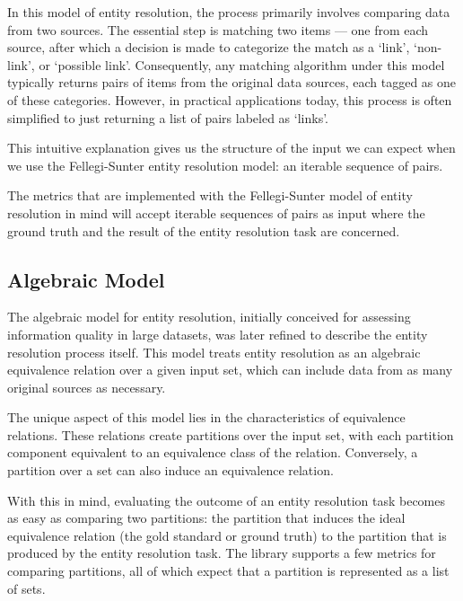 \documentclass[a4paper,twoside]{article}
\begin{document}
    In this model of entity resolution, the process primarily involves comparing
    data from two sources.
    The essential step is matching two items --- one from each source, after
    which a decision is made to categorize the match as a `link', `non-link', or
    `possible link'.
    Consequently, any matching algorithm under this model typically returns
    pairs of items from the original data sources, each tagged as one of these
    categories.
    However, in practical applications today, this process is often simplified
    to just returning a list of pairs labeled as `links'.

    This intuitive explanation gives us the structure of the input we can expect
    when we use the Fellegi-Sunter entity resolution model: an iterable sequence
    of pairs.

    The metrics that are implemented with the Fellegi-Sunter model of entity
    resolution in mind will accept iterable sequences of pairs as input where
    the ground truth and the result of the entity resolution task are concerned.

    \subsection{Algebraic Model}
    The algebraic model for entity resolution, initially conceived for assessing
    information quality in large datasets\cite{tal2007algebraic}, was later
    refined to describe the entity resolution process itself\cite{Tal11}.
    This model treats entity resolution as an algebraic equivalence relation
    over a given input set, which can include data from as many original sources
    as necessary.
    
    The unique aspect of this model lies in the characteristics of equivalence
    relations\cite{halmos1960naive}.
    These relations create partitions over the input set, with each partition
    component equivalent to an equivalence class of the relation\cite{Tal11}.
    Conversely, a partition over a set can also induce an equivalence relation.

    With this in mind, evaluating the outcome of an entity resolution task
    becomes as easy as comparing two partitions: the partition that induces the
    ideal equivalence relation (the gold standard or ground truth) to the
    partition that is produced by the entity resolution task.
    The library supports a few metrics for comparing partitions, all of which
    expect that a partition is represented as a list of sets.
\end{document}
